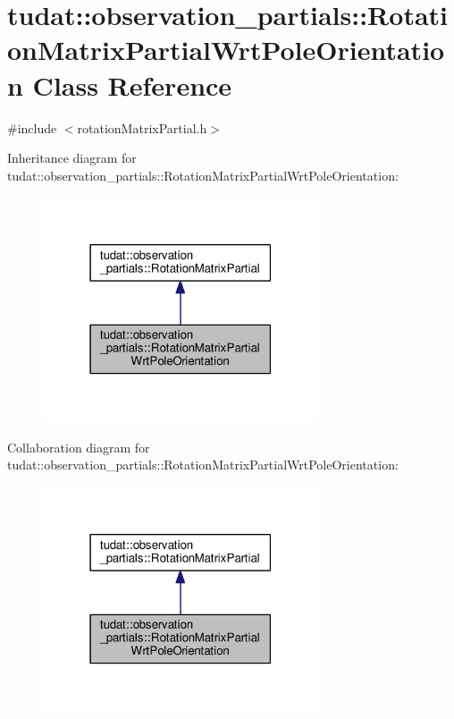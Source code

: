 \hypertarget{classtudat_1_1observation__partials_1_1RotationMatrixPartialWrtPoleOrientation}{}\section{tudat\+:\+:observation\+\_\+partials\+:\+:Rotation\+Matrix\+Partial\+Wrt\+Pole\+Orientation Class Reference}
\label{classtudat_1_1observation__partials_1_1RotationMatrixPartialWrtPoleOrientation}


{\ttfamily \#include $<$rotation\+Matrix\+Partial.\+h$>$}



Inheritance diagram for tudat\+:\+:observation\+\_\+partials\+:\+:Rotation\+Matrix\+Partial\+Wrt\+Pole\+Orientation\+:
\nopagebreak
\begin{figure}[H]
\begin{center}
\leavevmode
\includegraphics[width=231pt]{classtudat_1_1observation__partials_1_1RotationMatrixPartialWrtPoleOrientation__inherit__graph}
\end{center}
\end{figure}


Collaboration diagram for tudat\+:\+:observation\+\_\+partials\+:\+:Rotation\+Matrix\+Partial\+Wrt\+Pole\+Orientation\+:
\nopagebreak
\begin{figure}[H]
\begin{center}
\leavevmode
\includegraphics[width=231pt]{classtudat_1_1observation__partials_1_1RotationMatrixPartialWrtPoleOrientation__coll__graph}
\end{center}
\end{figure}
